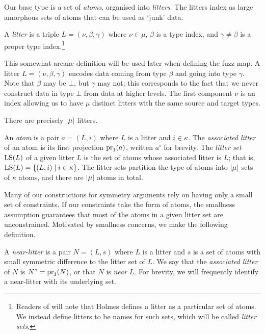 Our base type is a set of \emph{atoms}, organised into \emph{litters}.
The litters index as large amorphous sets of atoms that can be used as `junk' data.
\begin{definition}
    A \emph{litter} is a triple \( L = (\nu, \beta, \gamma) \) where \( \nu \in \mu \), \( \beta \) is a type index, and \( \gamma \neq \beta \) is a proper type index.\footnote{Readers of \cite{con-nf} will note that Holmes defines a litter as a particular set of atoms. We instead define litters to be names for such sets, which will be called \emph{litter sets}.}
\end{definition}
This somewhat arcane definition will be used later when defining the fuzz map.
A litter \( L = (\nu, \beta, \gamma) \) encodes data coming from type \( \beta \) and going into type \( \gamma \).
Note that \( \beta \) may be \( \bot \), but \( \gamma \) may not; this corresponds to the fact that we never construct data in type \( \bot \) from data at higher levels.
The first component \( \nu \) is an index allowing us to have \( \mu \) distinct litters with the same source and target types.
\begin{remark}
    There are precisely \( \left|\mu\right| \) litters.
\end{remark}
\begin{definition}
    An \emph{atom} is a pair \( a = (L, i) \) where \( L \) is a litter and \( i \in \kappa \).
    The \emph{associated litter} of an atom is its first projection \( \operatorname{pr}_1(a) \), written \( a^\circ \) for brevity.
    The \emph{litter set} \( \operatorname{LS}(L) \) of a given litter \( L \) is the set of atoms whose associated litter is \( L \); that is, \( \operatorname{LS}(L) = \{ (L, i) \mid i \in \kappa \} \).
    The litter sets partition the type of atoms into \( \left|\mu\right| \) sets of \( \kappa \) atoms, and there are \( \left|\mu\right| \) atoms in total.
\end{definition}
\begin{remark}
    Many of our constructions for symmetry arguments rely on having only a small set of constraints.
    If our constraints take the form of atoms, the smallness assumption guarantees that most of the atoms in a given litter set are unconstrained.
    Motivated by smallness concerns, we make the following definition.
\end{remark}
\begin{definition}
    A \emph{near-litter} is a pair \( N = (L, s) \) where \( L \) is a litter and \( s \) is a set of atoms with small symmetric difference to the litter set of \( L \).
    We say that the \emph{associated litter} of \( N \) is \( N^\circ = \operatorname{pr}_1(N) \), or that \( N \) is \emph{near} \( L \).
    For brevity, we will frequently identify a near-litter with its underlying set.
\end{definition}
